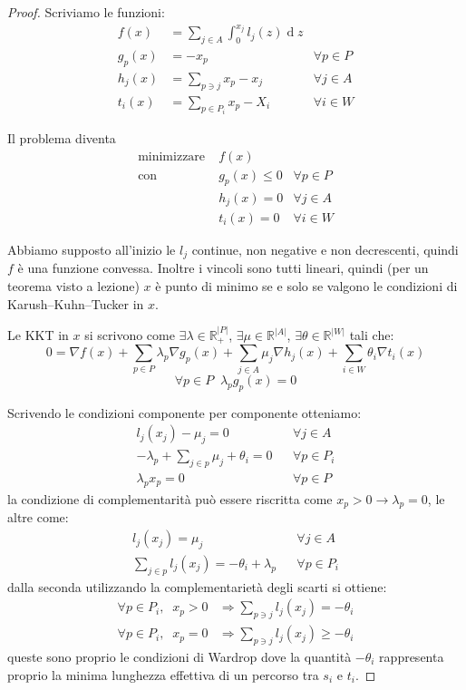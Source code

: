 \documentclass[a4paper]{article}
\theoremstyle{plain}
\theoremstyle{definition}
\theoremstyle{remark}
\newcommand{\abs}[1]{\left|#1\right|}
\DeclareMathOperator{\de}{d}
\begin{document}
\begin{proof}
  Scriviamo le funzioni:
  \begin{align*}
    f(x) &= \sum _{j\in A} \int _0 ^ {x_j} l_j(z)\de z \\
    g_p(x) &= -x_p & \forall p\in P \\
    h_j(x) &= \sum _{p\ni j} x_p -x_j & \forall j\in A\\
    t_i(x) &= \sum _{p\in P_i} x_p - X_i & \forall i\in W
  \end{align*}
  
  Il problema diventa
  \begin{align*}
    \text{minimizzare} \;&  f(x) \\
    \text{con} \;& g_p(x) \le 0 &\forall p \in P \\
                         & h_j(x) = 0 & \forall j\in A\\
                         & t_i(x) = 0 & \forall i\in W
  \end{align*}

  Abbiamo supposto all'inizio le $l_j$ continue, non negative e non
  decrescenti, quindi $f$ è una funzione convessa. Inoltre i vincoli
  sono tutti lineari, quindi (per un teorema visto a lezione) $x$ è
  punto di minimo se e solo se valgono le condizioni di
  Karush–Kuhn–Tucker in $x$.

  Le KKT in $x$ si scrivono come $\exists \lambda \in \mathbb{R}_+^{\abs{P}}$,
  $\exists \mu \in \mathbb{R}^{\abs{A}}$,
  $\exists \theta \in \mathbb{R}^{\abs{W}}$ tali che:
  \[ 0 = \nabla f(x) + \sum_{p\in P}\lambda _p \nabla g_p(x) + \sum _{j\in
      A} \mu _j \nabla h_j(x) + \sum _{i\in W} \theta _i \nabla t_i(x) \]
  \[ \forall p\in P\;\; \lambda _p g_p(x) = 0 \]
  
  Scrivendo le condizioni componente per componente otteniamo:
  \begin{align*}
    l_j(x_j) - \mu _j =0 && \forall j\in A \\
    -\lambda _p + \sum _{j\in p}\mu _j + \theta _i =0 && \forall p \in
                                                      P _i \\
    \lambda _p x_p =0 && \forall p\in P
  \end{align*}
  la condizione di complementarità può essere riscritta come $x_p > 0
  \rightarrow \lambda _p =0$, le altre come:
  \begin{align*}
    l_j(x_j) = \mu _j && \forall j\in A \\
    \sum _{j\in p}l_j(x_j) = -\theta _i + \lambda _p && \forall p \in
                                                      P _i
  \end{align*}
  dalla seconda utilizzando la complementarietà degli scarti si
  ottiene:
  \begin{align*}
    \forall p\in P_i,\;\; x_p > 0 & \Rightarrow \sum _{p\ni j} l_j(x_j) = -\theta _i \\
    \forall p\in P_i,\;\; x_p = 0 & \Rightarrow \sum _{p\ni j} l_j(x_j) \ge -\theta _i
  \end{align*}
  queste sono proprio le condizioni di Wardrop dove la quantità
  $-\theta _i$ rappresenta proprio la minima lunghezza effettiva di un
  percorso tra $s_i$ e $t_i$.
\end{proof}
\end{document}
